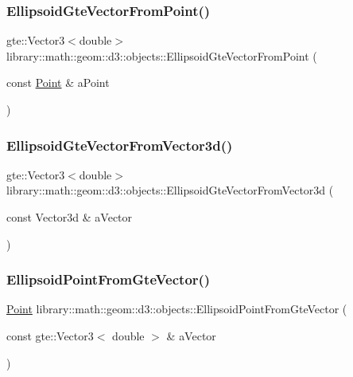 \subsubsection{\texorpdfstring{Ellipsoid\+Gte\+Vector\+From\+Point()}{EllipsoidGteVectorFromPoint()}}
{\footnotesize\ttfamily gte\+::\+Vector3$<$double$>$ library\+::math\+::geom\+::d3\+::objects\+::\+Ellipsoid\+Gte\+Vector\+From\+Point (\begin{DoxyParamCaption}\item[{const \hyperlink{classlibrary_1_1math_1_1geom_1_1d3_1_1objects_1_1_point}{Point} \&}]{a\+Point }\end{DoxyParamCaption})}

\mbox{\label{namespacelibrary_1_1math_1_1geom_1_1d3_1_1objects_a907b60e23a36bd9550b27f90380c347e}} 
\subsubsection{\texorpdfstring{Ellipsoid\+Gte\+Vector\+From\+Vector3d()}{EllipsoidGteVectorFromVector3d()}}
{\footnotesize\ttfamily gte\+::\+Vector3$<$double$>$ library\+::math\+::geom\+::d3\+::objects\+::\+Ellipsoid\+Gte\+Vector\+From\+Vector3d (\begin{DoxyParamCaption}\item[{const Vector3d \&}]{a\+Vector }\end{DoxyParamCaption})}

\mbox{\label{namespacelibrary_1_1math_1_1geom_1_1d3_1_1objects_afba4450ebf70aa313406e81b624abb96}} 
\subsubsection{\texorpdfstring{Ellipsoid\+Point\+From\+Gte\+Vector()}{EllipsoidPointFromGteVector()}}
{\footnotesize\ttfamily \hyperlink{classlibrary_1_1math_1_1geom_1_1d3_1_1objects_1_1_point}{Point} library\+::math\+::geom\+::d3\+::objects\+::\+Ellipsoid\+Point\+From\+Gte\+Vector (\begin{DoxyParamCaption}\item[{const gte\+::\+Vector3$<$ double $>$ \&}]{a\+Vector }\end{DoxyParamCaption})}

